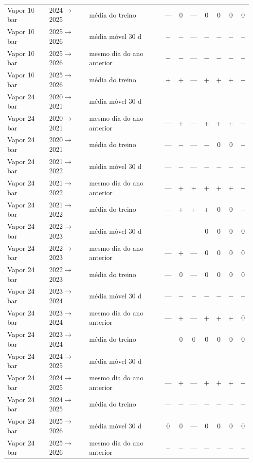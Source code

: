 {\begin{xltabular}{\linewidth}{@{}llp{2.6cm}ccccccc@{}}
Vapor 10 bar & 2024$\to$2025 & média do treino & --- & 0 & --- & 0 & 0 & 0 & 0 \\
Vapor 10 bar & 2025$\to$2026 & média móvel 30 d & $-$ & $-$ & --- & $-$ & $-$ & $-$ & $-$ \\
Vapor 10 bar & 2025$\to$2026 & mesmo dia do ano anterior & $-$ & $-$ & --- & $-$ & $-$ & $-$ & $-$ \\
Vapor 10 bar & 2025$\to$2026 & média do treino & + & + & --- & + & + & + & + \\
Vapor 24 bar & 2020$\to$2021 & média móvel 30 d & --- & $-$ & --- & $-$ & $-$ & $-$ & $-$ \\
Vapor 24 bar & 2020$\to$2021 & mesmo dia do ano anterior & --- & + & --- & + & + & + & + \\
Vapor 24 bar & 2020$\to$2021 & média do treino & --- & $-$ & --- & $-$ & 0 & 0 & $-$ \\
Vapor 24 bar & 2021$\to$2022 & média móvel 30 d & --- & $-$ & --- & $-$ & $-$ & $-$ & $-$ \\
Vapor 24 bar & 2021$\to$2022 & mesmo dia do ano anterior & --- & + & + & + & + & + & + \\
Vapor 24 bar & 2021$\to$2022 & média do treino & --- & + & + & + & 0 & 0 & + \\
Vapor 24 bar & 2022$\to$2023 & média móvel 30 d & --- & $-$ & --- & 0 & 0 & 0 & 0 \\
Vapor 24 bar & 2022$\to$2023 & mesmo dia do ano anterior & --- & + & --- & 0 & 0 & 0 & 0 \\
Vapor 24 bar & 2022$\to$2023 & média do treino & --- & 0 & --- & 0 & 0 & 0 & 0 \\
Vapor 24 bar & 2023$\to$2024 & média móvel 30 d & --- & $-$ & $-$ & $-$ & $-$ & $-$ & $-$ \\
Vapor 24 bar & 2023$\to$2024 & mesmo dia do ano anterior & --- & + & --- & + & + & + & 0 \\
Vapor 24 bar & 2023$\to$2024 & média do treino & --- & 0 & 0 & 0 & 0 & 0 & 0 \\
Vapor 24 bar & 2024$\to$2025 & média móvel 30 d & --- & $-$ & --- & $-$ & $-$ & $-$ & $-$ \\
Vapor 24 bar & 2024$\to$2025 & mesmo dia do ano anterior & --- & + & --- & + & + & + & + \\
Vapor 24 bar & 2024$\to$2025 & média do treino & --- & $-$ & --- & $-$ & $-$ & $-$ & $-$ \\
Vapor 24 bar & 2025$\to$2026 & média móvel 30 d & 0 & 0 & --- & 0 & 0 & 0 & 0 \\
Vapor 24 bar & 2025$\to$2026 & mesmo dia do ano anterior & $-$ & $-$ & --- & $-$ & $-$ & $-$ & $-$ \\

\end{xltabular}}
